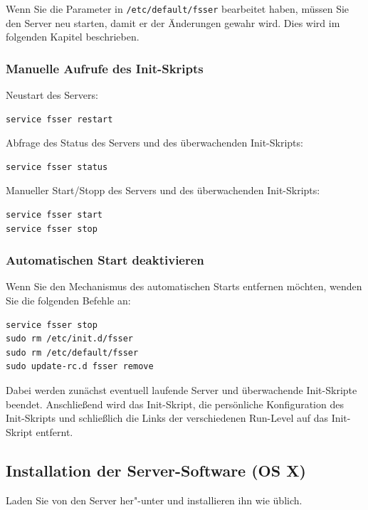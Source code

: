 \documentclass[10pt,a4paper]{scrartcl}		%
\begin{document}
Wenn Sie die Parameter in \texttt{/etc/default/fsser} bearbeitet haben,
müssen Sie den Server neu starten, damit er der Änderungen gewahr wird. Dies
wird im folgenden Kapitel beschrieben.

\subsubsection*{Manuelle Aufrufe des Init-Skripts}
Neustart des Servers:

\begin{verbatim}
service fsser restart
\end{verbatim}

Abfrage des Status des Servers und des überwachenden Init-Skripts:

\begin{verbatim}
service fsser status
\end{verbatim}

Manueller Start/Stopp des Servers und des überwachenden Init-Skripts:

\begin{verbatim}
service fsser start
service fsser stop
\end{verbatim}

\subsubsection*{Automatischen Start deaktivieren}
Wenn Sie den Mechanismus des automatischen Starts entfernen möchten,
wenden Sie die folgenden Befehle an:

\begin{verbatim}
service fsser stop
sudo rm /etc/init.d/fsser
sudo rm /etc/default/fsser
sudo update-rc.d fsser remove
\end{verbatim}

Dabei werden zunächst eventuell laufende Server und überwachende Init-Skripte
beendet. Anschließend wird das Init-Skript, die persönliche Konfiguration
des Init-Skripts und schließlich die Links der verschiedenen Run-Level
auf das Init-Skript entfernt.

\subsection{Installation der Server-Software (OS X)}
Laden Sie von \osxbinaries{} den Server her"-unter und installieren ihn 
wie üblich.
\end{document}
